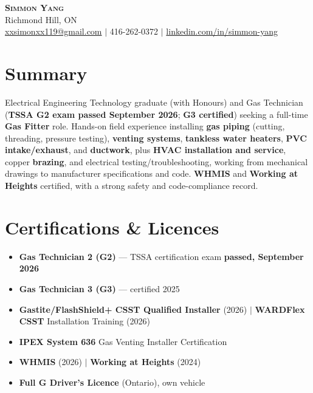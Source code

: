 \documentclass[letterpaper,11pt]{article}
\begin{document}
\begin{center}
    \textbf{\Huge \scshape Simmon Yang} \\ \vspace{1pt}
    Richmond Hill, ON \\
    \href{mailto:xxsimonxx119@gmail.com}{xxsimonxx119@gmail.com} $|$ 416-262-0372 $|$
    \href{https://www.linkedin.com/in/simmon-yang/}{linkedin.com/in/simmon-yang}
\end{center}

\section{Summary}
Electrical Engineering Technology graduate (with Honours) and Gas Technician (\textbf{TSSA G2 exam passed September 2026}; \textbf{G3 certified}) seeking a full-time \textbf{Gas Fitter} role. Hands-on field experience installing \textbf{gas piping} (cutting, threading, pressure testing), \textbf{venting systems}, \textbf{tankless water heaters}, \textbf{PVC intake/exhaust}, and \textbf{ductwork}, plus \textbf{HVAC installation and service}, copper \textbf{brazing}, and electrical testing/troubleshooting, working from mechanical drawings to manufacturer specifications and code. \textbf{WHMIS} and \textbf{Working at Heights} certified, with a strong safety and code-compliance record.

\section{Certifications \& Licences}
\begin{itemize}[leftmargin=0.15in]
  \item \textbf{Gas Technician 2 (G2)} --- TSSA certification exam \textbf{passed, September 2026}
  \item \textbf{Gas Technician 3 (G3)} --- certified 2025
  \item \textbf{Gastite/FlashShield+ CSST Qualified Installer} (2026) $|$ \textbf{WARDFlex CSST} Installation Training (2026)
  \item \textbf{IPEX System 636} Gas Venting Installer Certification
  \item \textbf{WHMIS} (2026) $|$ \textbf{Working at Heights} (2024)
  \item \textbf{Full G Driver's Licence} (Ontario), own vehicle
\end{itemize}
\end{document}
